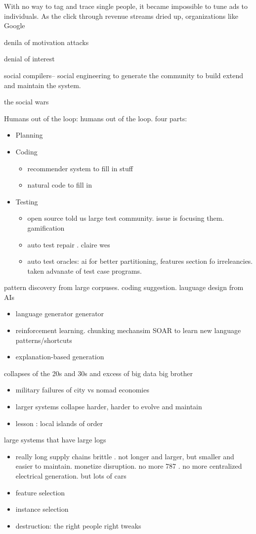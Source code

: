 \documentclass[journal]{IEEEtran}
\newcommand{\bi}{\begin{itemize}}
\newcommand{\ei}{\end{itemize}}
\begin{document}
With no way to tag and trace single people, it became impossible to tune ads to individuals.  As the click through revenue streams dried up, organizations like Google




denila of motivation attacks

denial of interest

social compilers-- social engineering to generate the community to build
extend and maintain the system. 

the social wars

Humans out of the loop: humans out of the loop. four parts:
\bi
\item Planning
\item Coding
\bi
\item recommender system to fill in stuff
\item natural code to fill in
\ei
\item Testing
\bi
\item open source told us large test community. issue is focusing them. gamification
\item auto test repair . claire wes
\item auto test oracles: ai for better partitioning, features section fo irreleancies.
taken advanate of test case programs. 
\ei
\ei

pattern discovery from large corpuses. coding suggestion. lauguage design from AIs 

\bi
\item language generator generator
\item reinforcement learning. chunking mechansim SOAR to learn new language patterns/shortcuts
\item explanation-based generation
\ei

collapses of the 20s and 30s and excess of big data big brother
\bi
\item military failures of city vs nomad economies
\item larger systems collapse harder, harder to evolve and maintain
\item lesson : local islands of order
\ei

large systems that have large logs
\bi
\item really long supply chains brittle . not longer and larger, but
smaller and easier to maintain. monetize disruption. no more 787 .
no more centralized electrical generation.
but lots of cars
\item feature selection
\item instance selection
\item destruction: the right people right tweaks
\ei
\end{document}
